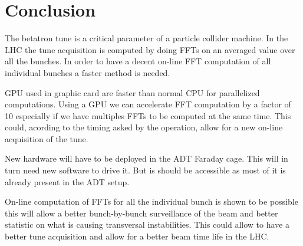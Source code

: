 
\chapter{Conclusion}


The betatron \gls{tune} is a critical parameter of a particle collider machine. In the \gls{LHC} the \gls{tune} acquisition is computed by doing \glspl{FFT} on an averaged value over all the bunches. In order to have a decent on-line \gls{FFT} computation of all individual bunches a faster method is needed. 

\Gls{GPU} used in graphic card are faster than normal \gls{CPU} for
parallelized computations. Using a \gls{GPU} we can accelerate
\gls{FFT} computation by a factor of 10 especially if we have
multiples \glspl{FFT} to be computed at the same time. This could,
acording to the timing asked by the operation, allow for a new on-line
acquisition of the \gls{tune}.

New hardware will have to be deployed in the \gls{ADT} Faraday cage. This will in turn need new software to drive it. But is should be accessible as most of it is already present in the \gls{ADT} setup.

On-line computation of \glspl{FFT} for all the individual bunch is shown to be possible this will allow a better bunch-by-bunch surveillance of the beam and better statistic on what is causing transversal instabilities. This could allow to have a better tune acquisition and allow for a better beam time life in the \gls{LHC}.